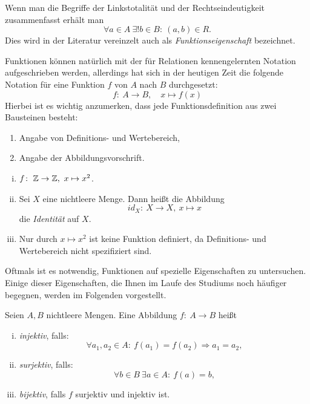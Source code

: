 \begin{remark}
Wenn man die Begriffe der Linkstotalität und der Rechtseindeutigkeit
zusammenfasst erhält man
\[
  \forall a \in A \  \exists ! b \in B\!:\ (a,b) \in R.
\]
Dies wird in der Literatur vereinzelt auch als \textit{Funktionseigenschaft}
bezeichnet.
\end{remark}


\begin{remark}
Funktionen können natürlich mit der für Relationen kennengelernten Notation
aufgeschrieben werden, allerdings hat sich in der heutigen Zeit die folgende
Notation für eine Funktion $f$ von $A$ nach $B$ durchgesetzt:
\[
  f\!:\ A \to B, \quad x \mapsto f(x)
\]
Hierbei ist es wichtig anzumerken, dass jede Funktionsdefinition aus zwei
Bausteinen besteht:

\begin{enumerate}
\item Angabe von Definitions- und Wertebereich,
\item Angabe der Abbildungsvorschrift.
\end{enumerate}
\end{remark}


\begin{example}
\begin{enumerate}[(i)]
\item $f\!:\ \mathbb{Z} \to \mathbb{Z},\ x \mapsto x^2$.

\item Sei $X$ eine nichtleere Menge. Dann heißt die Abbildung
\[
  id_X\!:\ X \to X,\ x \mapsto x
\]
die \textit{Identität} auf $X$.

\item Nur durch $x \mapsto x^2$ ist keine Funktion definiert, da
Definitions- und Wertebereich nicht spezifiziert sind.
\end{enumerate}
\end{example}


\vspace*{3em}
Oftmals ist es notwendig, Funktionen auf spezielle Eigenschaften zu untersuchen.
Einige dieser Eigenschaften, die Ihnen im Laufe des Studiums noch häufiger
begegnen, werden im Folgenden vorgestellt.


\begin{mydef}
Seien $A,B$ nichtleere Mengen.
Eine Abbildung $f\!:\ A \to B$ heißt

\begin{enumerate}[(i)]
\item \textit{injektiv}, falls:
\[
  \forall a_1,a_2 \in A\!:\ f(a_1)=f(a_2) \Rightarrow a_1 = a_2,
\]

\item \textit{surjektiv}, falls:
\[
  \forall b \in B \ \exists a \in A\!:\ f(a) = b,
\]

\item \textit{bijektiv}, falls $f$ surjektiv und injektiv ist.
\end{enumerate}
\end{mydef}


